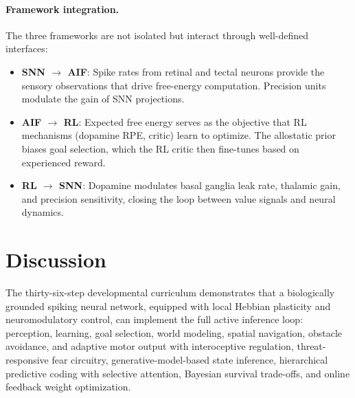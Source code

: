 \documentclass[11pt,a4paper]{article}
\begin{document}
\paragraph{Framework integration.}
The three frameworks are not isolated but interact through
well-defined interfaces:
\begin{itemize}[nosep]
  \item \textbf{SNN $\to$ AIF}: Spike rates from retinal and tectal neurons
    provide the sensory observations that drive free-energy computation.
    Precision units modulate the gain of SNN projections.
  \item \textbf{AIF $\to$ RL}: Expected free energy serves as the objective
    that RL mechanisms (dopamine RPE, critic) learn to optimize.
    The allostatic prior biases goal selection, which the RL critic then
    fine-tunes based on experienced reward.
  \item \textbf{RL $\to$ SNN}: Dopamine modulates basal ganglia leak rate,
    thalamic gain, and precision sensitivity, closing the loop between
    value signals and neural dynamics.
\end{itemize}

\section{Discussion}\label{sec:discussion}

The thirty-six-step developmental curriculum demonstrates that a biologically
grounded spiking neural network, equipped with local Hebbian plasticity and
neuromodulatory control, can implement the full active inference loop:
perception, learning, goal selection, world modeling, spatial navigation,
obstacle avoidance, and adaptive motor output with interoceptive regulation,
threat-responsive fear circuitry, generative-model-based state inference,
hierarchical predictive coding with selective attention, Bayesian survival
trade-offs, and online feedback weight optimization.
\end{document}
